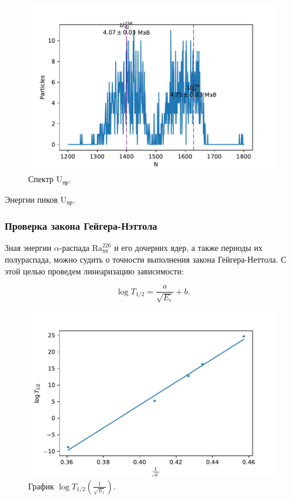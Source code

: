 \documentclass[10pt,a4paper]{article}
\begin{document}
\begin{multicols}{2}
	\begin{figure}[H]
		\includegraphics[width=1\textwidth]{gen/fig-u.pdf}
		\caption{Спектр $\text{U}_{\text{пр}}$.}
		\label{fig:u}
	\end{figure}
	
	\begin{table}[H]
		\addtolength{\tabcolsep}{-4pt}
		\footnotesize
		
		\caption{Энергии пиков $\text{U}_{\text{пр}}$.}
		\label{tab:u}
	\end{table}

	\subsubsection*{Проверка закона Гейгера-Нэттола}

	Зная энергии $\alpha$-распада $\text{Ra}_{88}^{226}$ и его дочерних ядер, а также периоды их полураспада, можно судить о точности выполнения закона Гейгера-Неттола. С этой целью проведем линеаризацию зависимости:
	
	$$\log{T_{1/2}} = \frac{a}{\sqrt{E_i}} + b.$$
	
	\begin{figure}[H]
		\includegraphics[width=1\textwidth]{gen/fig-te.pdf}
		\caption{График $\log{T_{1/2}} \left( \frac{1}{\sqrt{E_i}}\right)$.}
		\label{fig:te}
	\end{figure}
	

\end{multicols}
\end{document}
